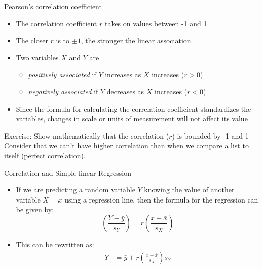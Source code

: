\documentclass[10pt]{beamer}\usepackage[]{graphicx}\usepackage[]{color}
\begin{document}
						
\begin{frame}{Pearson's correlation coefficient}
	\protect\hypertarget{two-numerical-variables}{}
	
	\begin{itemize}
		
		
		\item
		The correlation coefficient \(r\) takes on values between -1 and 1.
		\pause 
		\item
		The closer \(r\) is to \(\pm 1\), the stronger the linear association.
		\pause 
		
		\item 	Two variables \(X\) and \(Y\) are
		
		\begin{itemize}
			\item
			\emph{positively associated} if \(Y\) increases as \(X\) increases ($r>0$)
			\item
			\emph{negatively associated} if \(Y\) decreases as \(X\) increases ($r<0$)
		\end{itemize}
	
	\pause 
	
	\item Since the formula for calculating the correlation coefficient standardizes the variables, changes in scale or units of measurement will not affect its value
		
	\end{itemize}
	
	
\end{frame}





\begin{frame}{Exercise: Show mathematically that the correlation ($r$) is bounded by -1 and 1}
	\pause 
	Consider that we can't have higher correlation than when we compare a list to itself (perfect correlation).
	\vspace{4in}
\end{frame}


\begin{frame}{Correlation and Simple linear Regression}
	\begin{itemize}
		\item 
If we are predicting a random variable $Y$ knowing the value of another
variable $X=x$ using a regression line, then the formula for the regression can be given by:
\begin{equation}
\left(\frac{Y-\bar{y}}{s_{Y}}\right)=r\left(\frac{x-\bar{x}}{s_{X}}\right)
\end{equation}

\item This can be rewritten as:
\begin{align}
Y &= \bar{y}+r\left(\frac{x-\bar{x}}{s_{X}}\right) s_{Y}
\end{align}

	\end{itemize}
\end{frame}
\end{document}
